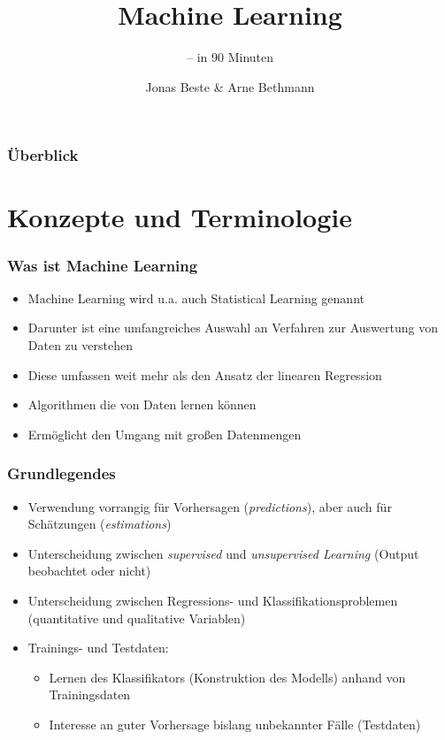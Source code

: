 \documentclass{beamer}
\title{Machine Learning}
\subtitle{-- in 90 Minuten}
\author{Jonas Beste \& Arne Bethmann}
\begin{document}
\begin{frame}
  \titlepage
\end{frame}

\begin{frame}
  \frametitle{Überblick}
  \tableofcontents
\end{frame}

\section{Konzepte und Terminologie}
\begin{frame}
  \frametitle{Was ist Machine Learning}
  
  \begin{itemize}
  \item Machine Learning wird u.a. auch Statistical Learning genannt
  \item Darunter ist eine umfangreiches Auswahl an Verfahren zur Auswertung von Daten zu verstehen
  \item Diese umfassen weit mehr als den Ansatz der linearen Regression
  \item Algorithmen die von Daten lernen können
  \item Ermöglicht den Umgang mit großen Datenmengen
  \end{itemize}  
\end{frame}

\begin{frame}
  \frametitle{Grundlegendes}  
  \begin{itemize}
  \item Verwendung vorrangig für Vorhersagen (\emph{predictions}), aber auch für Schätzungen (\emph{estimations})
  \item Unterscheidung zwischen \emph{supervised} und \emph{unsupervised Learning} (Output beobachtet oder nicht)
  \item Unterscheidung zwischen Regressions- und Klassifikationsproblemen (quantitative und qualitative Variablen)
  \item Trainings- und Testdaten:
      \begin{itemize} 
   \item Lernen des Klassifikators (Konstruktion des Modells) anhand von Trainingsdaten
  \item Interesse an guter Vorhersage bislang unbekannter Fälle (Testdaten)
 \end{itemize}  
 \end{itemize}  
 \end{frame}
\end{document}
